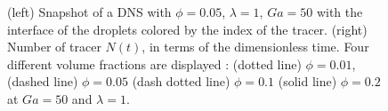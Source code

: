 \begin{figure}[h!]
    \centering
    \caption{
    (left) Snapshot of a DNS with $\phi = 0.05$, $\lambda = 1$, $Ga = 50$ with the interface of the droplets colored by the index of the tracer.
    (right) Number of tracer $N(t)$, in terms of the dimensionless time.
    Four different volume fractions are displayed : (dotted line) $\phi = 0.01$, (dashed line) $\phi = 0.05$ (dash dotted line) $\phi = 0.1$ (solid line) $\phi = 0.2$ at $Ga = 50$ and $\lambda = 1$. 
    }
    \label{fig:diagram}
\end{figure}

